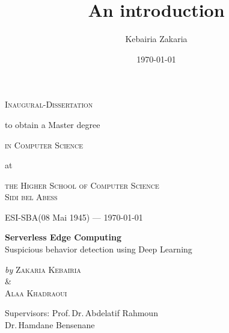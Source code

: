 \documentclass{mimosis}
\author{Kebairia Zakaria}
\date{\today}
\title{An introduction}
\numberwithin{equation}{chapter}
\numberwithin{listing}{chapter}
\begin{document}
 \frontmatter
{}

\begin{titlepage}
	\begin{center}
		\textsc{\huge Inaugural-Dissertation}
                \vskip 1cm
                \begin{large}
                  to obtain a Master degree\\[0.50cm]
                  \begin{Large}
                    \textsc{in Computer Science}\\[0.50cm]
                  \end{Large}
                  at\\[0.50cm]
                  \begin{Large}
                    \textsc{the Higher School of Computer Science\\Sidi bel Abess}\par
                  \end{Large}
                \end{large}
		\vfill
    \vskip 1cm
    \begin{small}
      ESI-SBA(08 Mai 1945) --- \today
    \end{small}
	\end{center}
\end{titlepage}

\begin{titlepage}
  \phantom{}
  \vfill 
  \begin{center}
    \begin{singlespace*}
      \begin{Huge}
          \textbf{Serverless Edge Computing}\\
          Suspicious behavior detection using Deep Learning\par
      \end{Huge}
      \vskip 0.25cm
      \emph{by}
      \vskip 0.25cm
      \textsc{Zakaria Kebairia\\
                      \&\\
              Alaa Khadraoui}\par
    \end{singlespace*}
  \end{center}
  \vfill
  \begin{singlespace*}
    Supervisors:            Prof.\,Dr.\,Abdelatif Rahmoun\\
    \phantom{Supervisors:}  Dr.\,Hamdane Bensenane
  \end{singlespace*}
\end{titlepage}
\end{document}
